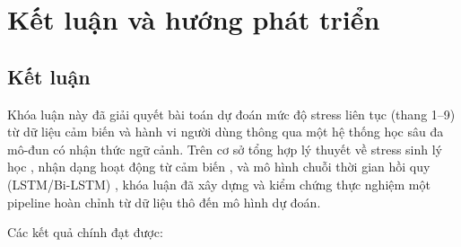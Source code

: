 
\chapter{Kết luận và hướng phát triển}
\label{chap:conclusion}

\section{Kết luận}
\label{sec:conclusion}

Khóa luận này đã giải quyết bài toán dự đoán mức độ stress liên tục (thang 1--9) từ dữ liệu cảm biến và hành vi người dùng thông qua một hệ thống học sâu đa mô-đun có nhận thức ngữ cảnh. Trên cơ sở tổng hợp lý thuyết về stress sinh lý học \cite{chrousos2009stress, mcewen2008central}, nhận dạng hoạt động từ cảm biến \cite{kwapisz2010activity, ordonez2016deep}, và mô hình chuỗi thời gian hồi quy (LSTM/Bi-LSTM) \cite{hochreiter1997lstm, schuster1997bidirectional}, khóa luận đã xây dựng và kiểm chứng thực nghiệm một pipeline hoàn chỉnh từ dữ liệu thô đến mô hình dự đoán.

Các kết quả chính đạt được:

